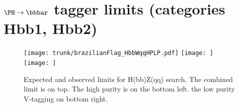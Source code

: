\newpage
\section{$\Hbb$ tagger limits (categories Hbb1, Hbb2)}
\label{results}

\iffalse

\begin{figure}[h!tpb]
\begin{center}
\texttt{[image: trunk/brazilianFlag\_HbbWqqHPLP.pdf]}
\texttt{[image: ]}
\texttt{[image: ]}
\end{center}
\caption{Expected and observed limits for H(bb)Z(qq) search. The combined limit is on top. 
The high purity is on the bottom left. the low purity V-tagging on bottom right.   
}
\label{fig:HbbZqqLimits}
\end{figure}

